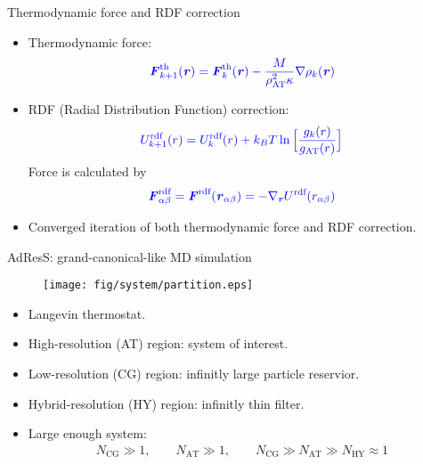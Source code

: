 \documentclass[]{beamer}
\newcommand{\bluec}[1]{{\color{blue} #1}}
\newcommand{\vect}[1]{\textbf{\textit{#1}}}
\newcommand{\AT}{{\textrm{{AT}}}}
\newcommand{\CG}{{\textrm{CG}}}
\newcommand{\HY}{{\textrm{HY}}}
\newcommand{\thf}{{\textrm{th}}}
\newcommand{\rdf}{{\textrm{rdf}}}
\begin{document}
\begin{frame}{Thermodynamic force and RDF correction}
  \begin{itemize}
  \item<1-> Thermodynamic force:
    \begin{align*}
      \bluec{
        \vect F_{k+1}^\thf (\vect r) = \vect F_k^\thf (\vect r)-
        \frac{M}{\rho_\AT^2\kappa} \nabla\rho_k(\vect r)
      }
    \end{align*}
  \item<2-> RDF (Radial Distribution Function) correction:
    \begin{align*}
      \bluec{
        U_{k+1}^\rdf(r) = U_k^\rdf(r) + k_BT \ln \Big[\frac{g_k(r)}{g_\AT(r)}\Big] 
      }
    \end{align*}
    Force is calculated by
    \begin{align*}
      \bluec{
      \vect F_{\alpha\beta}^\rdf = \vect F^\rdf(\vect r_{\alpha\beta})
      = -\nabla_{\vect r} U^\rdf(r_{\alpha\beta})
      }
    \end{align*}
  \item<3-> Converged iteration of both thermodynamic force and RDF correction.
  \end{itemize}
\end{frame}


\begin{frame}{AdResS: grand-canonical-like MD simulation}
    \vfill
  \begin{figure}
    \centering 
    \texttt{[image: fig/system/partition.eps]}
  \end{figure}
  \begin{itemize}
    \vfill
  \item<1-> Langevin thermostat.
    \vfill
  \item<2-> High-resolution (AT) region: system of interest.
    \vfill
  \item<3-> Low-resolution (CG) region: infinitly large particle reservior.
    \vfill
  \item<4-> Hybrid-resolution (HY) region: infinitly thin filter.
    \vfill
  \item <5-> Large enough system:
    \bluec{
      \begin{align*}
        N_\CG \gg 1,\qquad
        N_\AT \gg 1,\qquad
        N_\CG \gg N_\AT \gg N_\HY \approx 1
      \end{align*}
    }
  \end{itemize}
    \vfill
\end{frame}
\end{document}

